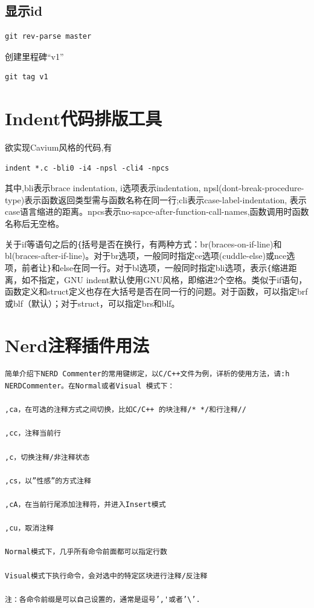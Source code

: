 \subsection{显示id}
\begin{verbatim}
git rev-parse master
\end{verbatim}

创建里程碑``v1''
\begin{verbatim}
git tag v1
\end{verbatim}




\section{Indent代码排版工具}

欲实现Cavium风格的代码,有
\begin{verbatim}
indent *.c -bli0 -i4 -npsl -cli4 -npcs
\end{verbatim}

其中,bli表示brace indentation, i选项表示indentation, npsl(dont-break-procedure-type)表示函数返回类型需与函数名称在同一行;cli表示case-label-indentation, 表示case语言缩进的距离。npcs表示no-sapce-after-function-call-names,函数调用时函数名称后无空格。

关于if等语句之后的\verb+{+括号是否在换行，有两种方式：br(braces-on-if-line)和bl(braces-after-if-line)。对于br选项，一般同时指定ce选项(cuddle-else)或nce选项，前者让\verb+}+和else在同一行。对于bl选项，一般同时指定bli选项，表示\verb+{+缩进距离，如不指定，GNU indent默认使用GNU风格，即缩进2个空格。类似于if语句，函数定义和struct定义也存在大括号是否在同一行的问题。对于函数，可以指定brf或blf（默认）；对于struct，可以指定brs和blf。
\section{Nerd注释插件用法}
\begin{verbatim}
简单介绍下NERD Commenter的常用键绑定，以C/C++文件为例，详析的使用方法，请:h NERDCommenter。在Normal或者Visual 模式下：

,ca，在可选的注释方式之间切换，比如C/C++ 的块注释/* */和行注释//

,cc，注释当前行

,c，切换注释/非注释状态

,cs，以”性感”的方式注释

,cA，在当前行尾添加注释符，并进入Insert模式

,cu，取消注释

Normal模式下，几乎所有命令前面都可以指定行数

Visual模式下执行命令，会对选中的特定区块进行注释/反注释

注：各命令前缀是可以自己设置的，通常是逗号’,'或者’\’.
\end{verbatim}
